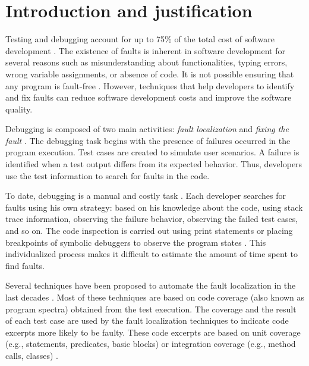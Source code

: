 \documentclass[12pt,a4paper,espaco=umemeio,noindentfirst,oneside,openany,tocpage=plain,pnumromarab,ruledheader,time,anapcustomindent]{sty/abnt}
\begin{document}
\tableofcontents

\section{Introduction and justification}
\label{intro}

Testing and debugging account for up to 75\% of the total cost of software development \cite{hailpern2002,tassey2002}.
The existence of faults is inherent in software development for several reasons such as misunderstanding about 
functionalities, typing errors, wrong variable assignments, or absence of code. It is not possible ensuring that any 
program is fault-free \cite{jones2007}. However, techniques that help developers to identify and fix faults can reduce 
software development costs and improve the software quality.

Debugging is composed of two main activities: \textit{fault localization} and \textit{fixing the fault} \cite{Myers2004}. 
The debugging task begins with the presence of failures occurred in the program execution. Test cases are created to 
simulate user scenarios. A failure is identified when a test output differs from its expected behavior. Thus, developers 
use the test information to search for faults in the code.

To date, debugging is a manual and costly task \cite{jones2007}. Each developer searches for faults using his own strategy: 
based on his knowledge about the code, using stack trace information, observing the failure behavior, observing the 
failed test cases, and so on. The code inspection is carried out using print statements or placing breakpoints of 
symbolic debuggers to observe the program states \cite{jones2007}. This individualized process makes it difficult to 
estimate the amount of time spent to find faults.

Several techniques have been proposed to automate the fault localization in the last decades 
\cite{mariani2011,naish2010,santelices2009,masri2010,burger2008}. Most of these techniques 
are based on code coverage (also known as program spectra) obtained from the test execution. The coverage and the result 
of each test case are used by the fault localization techniques to indicate code excerpts more likely to be faulty. These code 
excerpts are based on unit coverage (e.g., statements, predicates, basic blocks) \cite{wong2010,jones2002} or integration 
coverage (e.g., method calls, classes) \cite{mariani2011,souza2012b,souza2013}.
\end{document}
